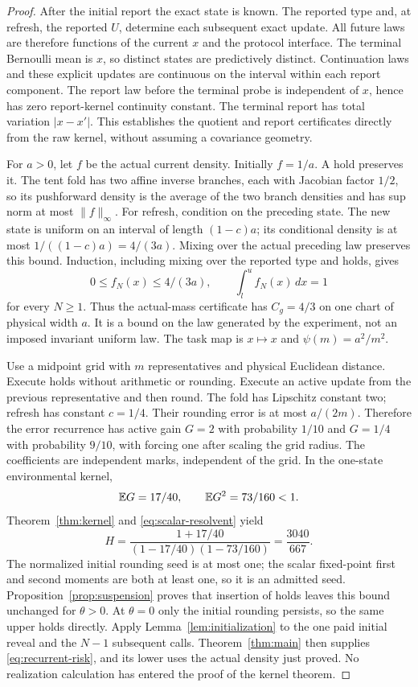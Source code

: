 \begin{proof}
After the initial report the exact state is known. The reported type and, at refresh, the reported $U$, determine each subsequent exact update. All future laws are therefore functions of the current $x$ and the protocol interface. The terminal Bernoulli mean is $x$, so distinct states are predictively distinct. Continuation laws and these explicit updates are continuous on the interval within each report component. The report law before the terminal probe is independent of $x$, hence has zero report-kernel continuity constant. The terminal report has total variation $|x-x'|$. This establishes the quotient and report certificates directly from the raw kernel, without assuming a covariance geometry.

For $a>0$, let $f$ be the actual current density. Initially $f=1/a$. A hold preserves it. The tent fold has two affine inverse branches, each with Jacobian factor $1/2$, so its pushforward density is the average of the two branch densities and has sup norm at most $\|f\|_\infty$. For refresh, condition on the preceding state. The new state is uniform on an interval of length $(1-c)a$; its conditional density is at most $1/((1-c)a)=4/(3a)$. Mixing over the actual preceding law preserves this bound. Induction, including mixing over the reported type and holds, gives
\[
 0\le f_N(x)\le4/(3a),\qquad \int_l^u f_N(x)\,dx=1
\]
for every $N\ge1$. Thus the actual-mass certificate has $C_g=4/3$ on one chart of physical width $a$. It is a bound on the law generated by the experiment, not an imposed invariant uniform law. The task map is $x\mapsto x$ and $\psi(m)=a^2/m^2$.

Use a midpoint grid with $m$ representatives and physical Euclidean distance. Execute holds without arithmetic or rounding. Execute an active update from the previous representative and then round. The fold has Lipschitz constant two; refresh has constant $c=1/4$. Their rounding error is at most $a/(2m)$. Therefore the error recurrence has active gain $G=2$ with probability $1/10$ and $G=1/4$ with probability $9/10$, with forcing one after scaling the grid radius. The coefficients are independent marks, independent of the grid. In the one-state environmental kernel,
\[
 \mathbb E G=17/40,\qquad \mathbb E G^2=73/160<1.
\]
Theorem~\ref{thm:kernel} and \eqref{eq:scalar-resolvent} yield
\[
 H=\frac{1+17/40}{(1-17/40)(1-73/160)}=\frac{3040}{667}.
\]
The normalized initial rounding seed is at most one; the scalar fixed-point first and second moments are both at least one, so it is an admitted seed. Proposition~\ref{prop:suspension} proves that insertion of holds leaves this bound unchanged for $\theta>0$. At $\theta=0$ only the initial rounding persists, so the same upper holds directly. Apply Lemma~\ref{lem:initialization} to the one paid initial reveal and the $N-1$ subsequent calls. Theorem~\ref{thm:main} then supplies \eqref{eq:recurrent-risk}, and its lower uses the actual density just proved. No realization calculation has entered the proof of the kernel theorem.


\end{proof}
